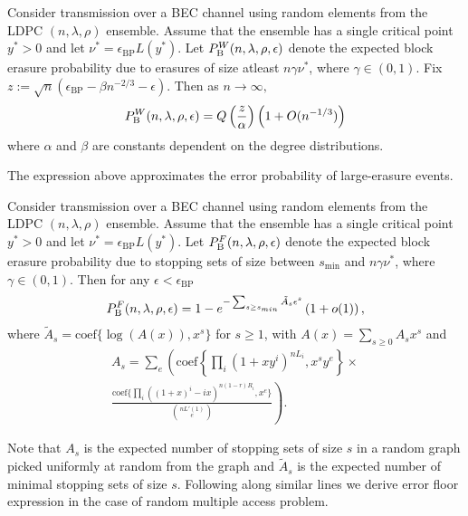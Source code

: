 \begin{theorem}
Consider transmission over a BEC channel using random elements from the LDPC $(n,\lambda,\rho)$ ensemble. Assume that the ensemble has a single critical point $y^*>0$ and let $\nu^*=\epsilon_{\text{BP}}L(y^*)$. Let $P_{\text{B}}^{W}(n,\lambda,\rho,\epsilon)$ denote the expected block erasure probability due to erasures of size atleast $n\gamma \nu^{*}$, where $\gamma\in (0,1)$. Fix $z:=\sqrt{n}(\epsilon_{\text{BP}}-\beta n^{-2/3}-\epsilon)$. Then as $n\rightarrow \infty ,$
\begin{align*}
P_{\text{B}}^{W}(n,\lambda,\rho,\epsilon)=Q\left(\frac{z}{\alpha}\right)\left(1+O(n^{-1/3})\right)
\end{align*}
where $\alpha$ and $\beta$ are constants dependent on the degree distributions.
\end{theorem}
The expression above approximates the error probability of large-erasure events.

\begin{theorem}
Consider transmission over a BEC channel using random elements from the LDPC $(n,\lambda,\rho)$ ensemble. Assume that the ensemble has a single critical point $y^*>0$ and let $\nu^*=\epsilon_{\text{BP}}L(y^*)$. Let $P_{\text{B}}^{F}(n,\lambda,\rho,\epsilon)$ denote the expected block erasure probability due to stopping sets of size between $s_{\text{min}}$ and  $n\gamma \nu^{*}$, where $\gamma\in (0,1)$. Then for any $\epsilon<\epsilon_{\text{BP}}$
\begin{align*}
P_{\text{B}}^{F}(n,\lambda,\rho,\epsilon)=1-e^{-\sum_{s\geq s_{min}}\tilde{A}_{s}\epsilon^s}\left(1+o(1)\right),
\end{align*}
where $\tilde{A}_{s}=\text{coef}\{\log(A(x)),x^s\}$ for $s\geq 1$, with $A(x)=\sum_{s\geq 0} A_{s}x^s$ and
\begin{multline}
A_{s}=\sum_{e}\left( \text{coef}\left\lbrace\prod_{i} (1+xy^{i})^{nL_{i}}, x^{s}y^{e} \right\rbrace \right.\times \\
\left.\frac{\text{coef}\lbrace \prod_{i}\left((1+x)^i -ix \right)^{n(1-r)R_{i}},x^{e}\rbrace}{\binom{nL'(1)}{e}}\right).
\end{multline}
\end{theorem}
Note that $A_{s}$ is the expected number of stopping sets of size $s$ in a random graph picked uniformly at random from the graph and $\tilde{A}_{s}$ is the expected number of minimal stopping sets of size $s$. Following along similar lines we derive error floor expression in the case of random multiple access problem.
 
